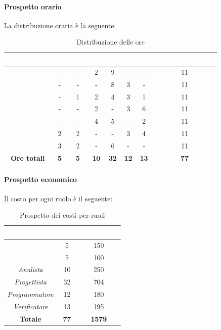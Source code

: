\paragraph*{Prospetto orario}
La distribuzione oraria è la seguente:
\begin{table}[H]
	\begin{center}
		\begin{tabular}{ |c c c c c c c c| }
			\rowcolor{darkblue} 
			\textcolor{white}{\textbf{Nominativo}} & \textcolor{white}{\textbf{Re}} & \textcolor{white}{\textbf{Am}} & \textcolor{white}{\textbf{An}} & \textcolor{white}{\textbf{Pt}} & \textcolor{white}{\textbf{Pr}} & \textcolor{white}{\textbf{Ve}} & \textcolor{white}{\textbf{Ore Complessive}} \\ \hline
			\BL 	& -  	& -  	& 2 	& 9 	& - 	& - 	& 11 \\ \hline
			\FF 	& -  	& -  	& - 	& 8 	& 3 	& -  	& 11 \\ \hline
			\MM 	& -  	& 1  	& 2 	& 4 	& 3 	& 1  	& 11 \\ \hline
			\PC 	& - 	& -  	& 2 	& - 	& 3 	& 6 	& 11 \\ \hline
			\TG 	& -  	& - 	& 4 	& 5 	& - 	& 2 	& 11 \\ \hline
			\TL 	& 2  	& 2 	& - 	& - 	& 3 	& 4 	& 11 \\ \hline
			\VD 	& 3  	& 2  	& - 	& 6 	& - 	& -  	& 11 \\ \hline
			\textbf{Ore totali} & \textbf{5} & \textbf{5} & \textbf{10} & \textbf{32} & \textbf{12} & \textbf{13} & \textbf{77} \\ \hline
		\end{tabular}
		\caption{Distribuzione delle ore }
	\end{center}
\end{table}
\paragraph*{Prospetto economico}
Il costo per ogni ruolo è il seguente:
 \begin{table}[H]
 	\begin{center}
 		\begin{tabular}{ |c c c| }
 			\rowcolor{darkblue} 
 			\textcolor{white}{\textbf{Ruolo}} & \textcolor{white}{\textbf{Ore}} & \textcolor{white}{\textbf{Costo in €}}\\ \hline
 			{\Responsabile} 			& 5 & 150 \\ \hline
 			{\Amministratore} 			& 5 & 100 \\ \hline
 			\textit{Analista} 			& 10 & 250 \\ \hline
 			\textit{Progettista} 		& 32 & 704\\ \hline
 			\textit{Programmatore}  	& 12 & 180 \\ \hline
 			\textit{Verificatore} 		& 13 & 195 \\ \hline
 			\textbf{Totale} & \textbf{77} & \textbf{1579} \\ \hline
 		\end{tabular}
 		\caption{Prospetto dei costi per ruoli}
 	\end{center}
 \end{table}
